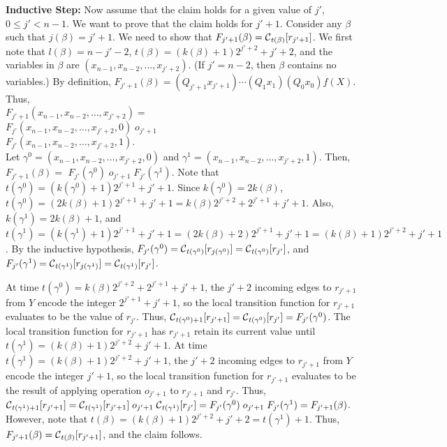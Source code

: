 \smallskip
\noindent
{\bf Inductive Step:} 
Now assume that the claim holds for a given value of $j'$, $0 \leq j' < n-1$.
We want to prove that the claim holds for $j'+1$.
Consider any $\beta$ such that $j(\beta) = j'+1$.
We need to show that $F_{j'+1}(\beta) = \mbox{$\mathcal{C}$}_{t(\beta)}[r_{j'+1}]$.
We first note that $l(\beta) = n-j'-2$, 
$t(\beta) = (k(\beta) + 1)2^{j'+2}+j'+2$,
and the variables in $\beta$ are $(x_{n-1}, x_{n-2}, \ldots , x_{j'+2})$.
(If $j' = n-2$, then $\beta$ contains no variables.)
By definition, 
$F_{j'+1}(\beta) =  (Q_{j'+1} x_{j'+1}) \cdots (Q_1 x_1) (Q_0 x_0) f(X)$.
Thus,\\
$F_{j'+1}(x_{n-1}, x_{n-2}, \ldots , x_{j'+2}) = $\\
\hspace*{0.1in}
$F_{j'}(x_{n-1}, x_{n-2}, \ldots , x_{j'+2}, 0) \; o_{j'+1} \;$\\
\hspace*{0.1in} $F_{j'}(x_{n-1}, x_{n-2}, \ldots , x_{j'+2}, 1).$\\
Let $\gamma^0 = (x_{n-1}, x_{n-2}, \ldots , x_{j'+2}, 0)$
and $\gamma^1 = (x_{n-1}, x_{n-2}, \ldots , x_{j'+2}, 1)$.
Then, $F_{j'+1}(\beta) =$  
$F_{j'}(\gamma^0) \; o_{j'+1} \; F_{j'}(\gamma^1)$.
Note that
$t(\gamma^0) = (k(\gamma^0)+1)2^{j'+1}+j'+1$.
Since $k(\gamma^0)= 2k(\beta)$,
$t(\gamma^0) = (2k(\beta)+1)2^{j'+1}+j'+1 = k(\beta)2^{j'+2}+2^{j'+1}+j'+1$.
Also, $k(\gamma^1)= 2k(\beta)+1$, and
$t(\gamma^1) = (k(\gamma^1)+1)2^{j'+1}+j'+1= 
(2k(\beta)+2)2^{j'+1}+j'+1 =  (k(\beta)+1)2^{j'+2}+j'+1$.
By the inductive hypothesis,
$F_{j'}(\gamma^0) = \mbox{$\mathcal{C}$}_{t(\gamma^0)}[r_{j(\gamma^0)}] = \mbox{$\mathcal{C}$}_{t(\gamma^0)}[r_{j'}]$,
and $F_{j'}(\gamma^1) = \mbox{$\mathcal{C}$}_{t(\gamma^1)}[r_{j(\gamma^1)}] = \mbox{$\mathcal{C}$}_{t(\gamma^1)}[r_{j'}]$.

At time $t(\gamma^0) = k(\beta)2^{j'+2}+2^{j'+1}+j'+1$,
the $j'+2$ incoming edges to $r_{j'+1}$ from $Y$ encode the integer $2^{j'+1}+j'+1$,
so the local transition function for $r_{j'+1}$ evaluates to be the value of $r_{j'}$.
Thus, $\mbox{$\mathcal{C}$}_{t(\gamma^0)+1}[r_{j'+1}] = \mbox{$\mathcal{C}$}_{t(\gamma^0)}[r_{j'}] = F_{j'}(\gamma^0)$.
The local transition function for $r_{j'+1}$ has $r_{j'+1}$ retain its current value until 
$t(\gamma^1) = (k(\beta)+1)2^{j'+2}+j'+1$.
At time $t(\gamma^1) =  (k(\beta)+1)2^{j'+2}+j'+1$,
the $j'+2$ incoming edges to $r_{j'+1}$ from $Y$ encode the integer $j'+1$,
so the local transition function for $r_{j'+1}$ evaluates to be the result
of applying operation $o_{j'+1}$ to  $r_{j'+1}$ and $r_{j'}$.
Thus, 
$\mbox{$\mathcal{C}$}_{t(\gamma^1)+1}[r_{j'+1}] = 
 \mbox{$\mathcal{C}$}_{t(\gamma^1)}[r_{j'+1}]  \; o_{j'+1} \; \mbox{$\mathcal{C}$}_{t(\gamma^1)}[r_{j'}] 
= F_{j'}(\gamma^0)  \; o_{j'+1} \; F_{j'}(\gamma^1) = F_{j'+1}(\beta)$.
However, note that $t(\beta) = (k(\beta) + 1)2^{j'+2}+j'+2 =  t(\gamma^1)+1$.
Thus, $F_{j'+1}(\beta) = \mbox{$\mathcal{C}$}_{t(\beta)}[r_{j'+1}]$, and
the claim follows. 


